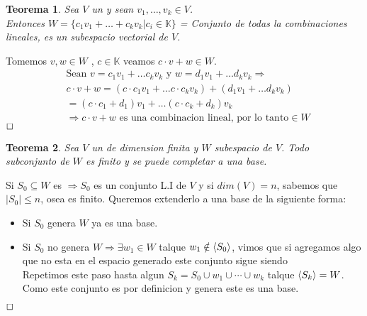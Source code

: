 \documentclass[]{article}
\newtheorem{theorem}{Teorema}
\newenvironment{proof}{\noindent{\bf Prueba:}}{$\hfill \Box$ \vspace{10pt}}
\newcommand{\K}{
    \mathbb{K}
}
\newcommand{\ida}{\Longrightarrow}
\begin{document}
\begin{theorem}
    Sea $V$ un \espvec y sean $v_1, \dots , v_k \in V$.\\
    Entonces $W=\{ c_1v_1+ \dots + c_kv_k | c_i \in \K\}$ = Conjunto de todas la combinaciones lineales,
    es un subespacio vectorial de $V$.
\end{theorem}
\begin{proof}
    Tomemos $v,w \in W$ , $c \in \K$ veamos $c \cdot v + w \in W$.
    \begin{align*}
        &\text{Sean } v= c_1v_1+ \dots c_kv_k \text{ y } w = d_1v_1 + \dots d_kv_k \ida \\
        &c \cdot v + w = (c \cdot c_1v_1+ \dots c \cdot c_kv_k) + (d_1v_1 + \dots d_kv_k)\\
        &= (c \cdot c_1 + d_1)v_1 + \dots (c \cdot c_k + d_k)v_k \\
        &\ida c \cdot v + w \text{ es una combinacion lineal, por lo tanto} \in W
    \end{align*}
\end{proof}

\begin{theorem}
    Sea $V$ un \espvec de dimension finita y $W$ subespacio de $V$. Todo subconjunto \li de $W$ es
    finito y se puede completar a una base. 
\end{theorem}
\begin{proof}
    Si $S_0 \subseteq W$ es \li $\ida S_0$ es un conjunto L.I de $V$ y si $dim(V)=n$, sabemos que $|S_0|\leq n$,
    osea es finito. Queremos extenderlo a una base de la siguiente forma:
    \begin{itemize}
        \item Si $S_0$ genera $W$ ya es una base.
        \item Si $S_0$ no genera $W \ida \exists w_1 \in W$ talque $w_1 \notin \text{$\langle S_0 \rangle$}$, vimos que si
        agregamos algo que no esta en el espacio generado este conjunto sigue siendo \li\\
        Repetimos este paso hasta algun $S_k = S_0 \cup w_1 \cup \cdots \cup w_k$ talque $\text{$\langle S_k \rangle$} = W$.
        Como este conjunto es por definicion \li y genera este es una base.  
    \end{itemize}
\end{proof}
\end{document}
